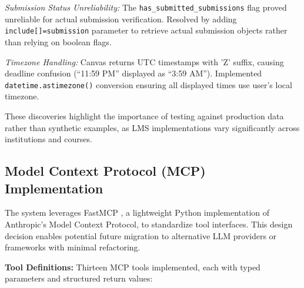 \documentclass{article}
\begin{document}
\textit{Submission Status Unreliability:} The \texttt{has\_submitted\_submissions} flag proved unreliable for actual submission verification. Resolved by adding \texttt{include[]=submission} parameter to retrieve actual submission objects rather than relying on boolean flags.

\textit{Timezone Handling:} Canvas returns UTC timestamps with 'Z' suffix, causing deadline confusion (``11:59 PM'' displayed as ``3:59 AM''). Implemented \texttt{datetime.astimezone()} conversion ensuring all displayed times use user's local timezone.

These discoveries highlight the importance of testing against production data rather than synthetic examples, as LMS implementations vary significantly across institutions and courses.


\subsection{Model Context Protocol (MCP) Implementation}

The system leverages FastMCP \cite{mcp2025landscape}, a lightweight Python implementation of Anthropic's Model Context Protocol, to standardize tool interfaces. This design decision enables potential future migration to alternative LLM providers or frameworks with minimal refactoring.

\textbf{Tool Definitions:} Thirteen MCP tools implemented, each with typed parameters and structured return values:
\end{document}
